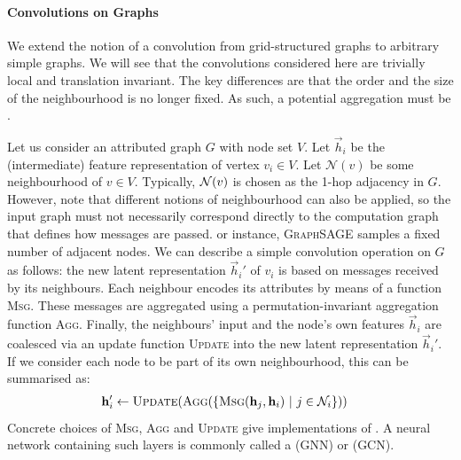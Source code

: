 \documentclass[
	fontsize=10pt, %
	twoside=true, %
	secnumdepth=1, %
  toc=indentunnumbered %
]{kaobook}
\begin{document}
\paragraph{Convolutions on Graphs} We extend the notion of a convolution
from grid-structured graphs to arbitrary simple graphs. We will see that
the convolutions considered here are trivially local and translation invariant.
The key differences are that the order and the size of the neighbourhood is no
longer fixed. As such, a potential aggregation must be .

Let us consider an attributed graph
$G$ with node set $V$.
Let $\vec h_i$ be the (intermediate) feature representation of vertex $v_i \in
V$. Let $\mathcal{N}(v)$ be some neighbourhood of $v \in V$. Typically,
$\mathcal{N}(v)$ is chosen as the 1-hop adjacency in $G$. However, note that
different notions of neighbourhood can also be applied, so the input graph must
not necessarily correspond directly to the computation graph that defines how
messages are passed. or instance, \textsc{GraphSAGE}
\cite{hamilton_InductiveRepresentationLearning_2018} samples a fixed number of
adjacent nodes. We can describe a simple convolution operation on $G$ as
follows: the new latent representation $\vec h_i'$ of $v_i$ is based on messages
received by its neighbours. Each neighbour encodes its attributes by means of a
function \textsc{Msg}. These messages are aggregated using a
permutation-invariant aggregation function \textsc{Agg}.
Finally, the neighbours' input and the node's own features $\vec h_i$ are
coalesced via an update function \textsc{Update} into the new latent
representation $\vec h_i'$. If we consider each node to be part of its own
neighbourhood, this can be summarised as:
\begin{align}
  & \vec h_i' \gets \textsc{Update}(\textsc{Agg}(\{\textsc{Msg}(\vec h_j, \vec h_i) ~|~ j \in \mathcal{N}_i\}))
    \label{eq:gnn-framework}
\end{align}
Concrete choices of \textsc{Msg}, \textsc{Agg} and \textsc{Update} give
implementations of . A neural network containing
such layers is commonly called a  (GNN)
or  (GCN).
\end{document}
